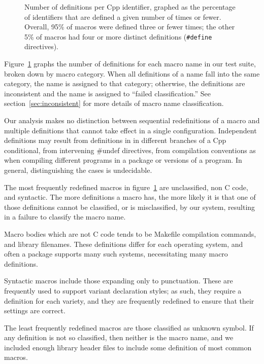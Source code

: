 \documentclass[10pt]{article}
\begin{document}
\begin{figure}
\centerline{}
\caption{Number of definitions per Cpp identifier, graphed as
  the percentage of identifiers that are defined a given number of times
  or fewer.  Overall, 95\% of macros were defined three or
  fewer times; the other 5\% of macros had four or more distinct
  definitions ({\tt \#define} directives).}
\label{fig:freq-def-cat}
\end{figure}

Figure~\ref{fig:freq-def-cat} graphs the number of definitions for each
macro name in our test suite, broken down by macro category.  When all
definitions of a name fall into the same category, the name is assigned to
that category; otherwise, the definitions are inconsistent and the name is
assigned to ``failed classification.''  See section~\ref{sec:inconsistent}
for more details of macro name classification.

Our analysis makes no distinction between sequential redefinitions of a
macro and multiple definitions that cannot take effect in a single
configuration.  Independent definitions may result from definitions in in
different branches of a Cpp conditional, from intervening {\#undef}
directives, from compilation conventions as when compiling different
programs in a package or versions of a program.  In general, distinguishing
the cases is undecidable.

The most frequently redefined macros in figure~\ref{fig:freq-def-cat} are
unclassified, non C code, and syntactic.  The more definitions a macro has,
the more likely it is that one of those definitions cannot be classified,
or is misclassified, by our system, resulting in a failure to classify the
macro name.

Macro bodies which are not C code tends to be Makefile compilation
commands, and library filenames.  These definitions differ for each
operating system, and often a package supports many such systems,
necessitating many macro definitions.  

Syntactic macros include those expanding only to punctuation.  These are
frequently used to support variant declaration styles; as such, they
require a definition for each variety, and they are frequently redefined to
ensure that their settings are correct.

The least frequently redefined macros are those classified as unknown
symbol.  If any definition is not so classified, then neither is the
macro name, and we included enough library header files to include some
definition of most common macros.
\end{document}
